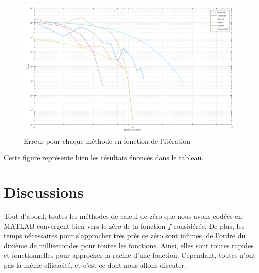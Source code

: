\documentclass[12pt]{article}
\begin{document}
\begin{figure}[H]
    \centering
    \includegraphics[width=0.95\linewidth]{graph.png}
    \caption{Erreur pour chaque méthode en fonction de l'itération}
    \label{fig1}
\end{figure}
\noindent Cette figure représente bien les résultats énoncés dans le tableau.




\section{Discussions}
\label{ref:discussions}
\noindent Tout d'abord, toutes les méthodes de calcul de zéro que nous avons codées en MATLAB convergent bien vers le zéro de la fonction $f$ considérée. De plus, les temps nécessaires pour s'approcher très près ce zéro sont infimes, de l'ordre du dixième de millisecondes pour toutes les fonctions. Ainsi, elles sont toutes rapides et fonctionnelles pour approcher la racine d'une fonction. Cependant, toutes n'ont pas la même efficacité, et c'est ce dont nous allons discuter.
\end{document}
